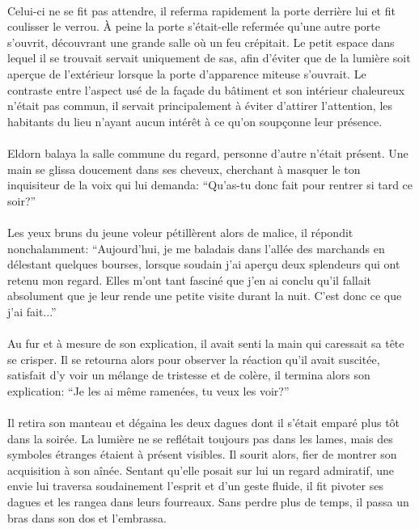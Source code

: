 \paragraph{}
Celui-ci ne se fit pas attendre, il referma rapidement la porte derrière lui
et fit coulisser le verrou. À peine la porte s'était-elle refermée qu'une
autre porte s'ouvrit, découvrant une grande salle où un feu crépitait. Le
petit espace dans lequel il se trouvait servait uniquement de sas, afin
d'éviter que de la lumière soit aperçue de l'extérieur lorsque la porte
d'apparence miteuse s'ouvrait. Le contraste entre l'aspect usé de la façade du
bâtiment et son intérieur chaleureux n'était pas commun, il servait
principalement à éviter d'attirer l'attention, les habitants du lieu n'ayant
aucun intérêt à ce qu'on soupçonne leur présence.

\paragraph{}
Eldorn balaya la salle commune du regard, personne d'autre n'était présent.
Une main se glissa doucement dans ses cheveux, cherchant à masquer le ton
inquisiteur de la voix qui lui demanda: ``Qu'as-tu donc fait pour rentrer si
tard ce soir?''

\paragraph{}
Les yeux bruns du jeune voleur pétillèrent alors de malice, il répondit
nonchalamment: ``Aujourd'hui, je me baladais dans l'allée des marchands en
délestant quelques bourses, lorsque soudain j'ai aperçu deux splendeurs qui
ont retenu mon regard. Elles m'ont tant fasciné que j'en ai conclu qu'il
fallait absolument que je leur rende une petite visite durant la nuit. C'est
donc ce que j'ai fait...''

\paragraph{}
Au fur et à mesure de son explication, il avait senti la main qui caressait sa
tête se crisper. Il se retourna alors pour observer la réaction qu'il avait
suscitée, satisfait d'y voir un mélange de tristesse et de colère, il termina
alors son explication: ``Je les ai même ramenées, tu veux les voir?''

\paragraph{}
Il retira son manteau et dégaina les deux dagues dont il s'était emparé plus
tôt dans la soirée. La lumière ne se reflétait toujours pas dans les lames,
mais des symboles étranges étaient à présent visibles. Il sourit alors, fier
de montrer son acquisition à son aînée. Sentant qu'elle posait sur lui un
regard admiratif, une envie lui traversa soudainement l'esprit et d'un geste
fluide, il fit pivoter ses dagues et les rangea dans leurs fourreaux. Sans
perdre plus de temps, il passa un bras dans son dos et l'embrassa.

